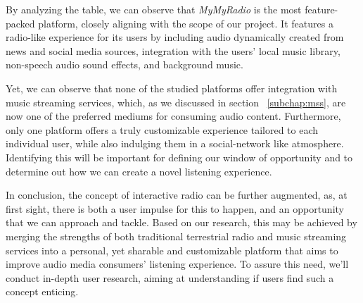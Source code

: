 By analyzing the table, we can observe that \textit{MyMyRadio} is the most feature-packed platform, closely aligning with the scope of our project. It features a radio-like experience for its users by including audio dynamically created from news and social media sources, integration with the users' local music library, non-speech audio sound effects, and background music. 

Yet, we can observe that none of the studied platforms offer integration with music streaming services, which, as we discussed in section ~\ref{subchap:mss}, are now one of the preferred mediums for consuming audio content. Furthermore, only one platform offers a truly customizable experience tailored to each individual user, while also indulging them in a social-network like atmosphere. Identifying this will be important for defining our window of opportunity and to determine out how we can create a novel listening experience.

In conclusion, the concept of interactive radio can be further augmented, as, at first sight, there is both a user impulse for this to happen, and an opportunity that we can approach and tackle. Based on our research, this may be achieved by merging the strengths of both traditional terrestrial radio and music streaming services into a personal, yet sharable and customizable platform that aims to improve audio media consumers' listening experience. To assure this need, we'll conduct in-depth user research, aiming at understanding if users find such a concept enticing.

